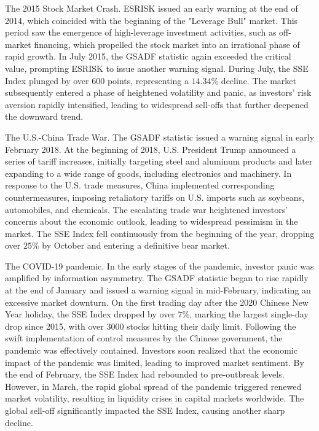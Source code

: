 \documentclass[12pt,a4paper]{article}
\begin{document}
    The 2015 Stock Market Crash. ESRISK issued an early warning at the end of 2014, which coincided with the beginning of the "Leverage Bull" market. This period saw the emergence of high-leverage investment activities, such as off-market financing, which propelled the stock market into an irrational phase of rapid growth. In July 2015, the GSADF statistic again exceeded the critical value, prompting ESRISK to issue another warning signal. During July, the SSE Index plunged by over 600 points, representing a $14.34\%$ decline. The market subsequently entered a phase of heightened volatility and panic, as investors' risk aversion rapidly intensified, leading to widespread sell-offs that further deepened the downward trend.

    The U.S.-China Trade War. The GSADF statistic issued a warning signal in early February 2018. At the beginning of 2018, U.S. President Trump announced a series of tariff increases, initially targeting steel and aluminum products and later expanding to a wide range of goods, including electronics and machinery. In response to the U.S. trade measures, China implemented corresponding countermeasures, imposing retaliatory tariffs on U.S. imports such as soybeans, automobiles, and chemicals. The escalating trade war heightened investors' concerns about the economic outlook, leading to widespread pessimism in the market. The SSE Index fell continuously from the beginning of the year, dropping over $25\%$ by October and entering a definitive bear market.

    The COVID-19 pandemic. In the early stages of the pandemic, investor panic was amplified by information asymmetry. The GSADF statistic began to rise rapidly at the end of January and issued a warning signal in mid-February, indicating an excessive market downturn. On the first trading day after the 2020 Chinese New Year holiday, the SSE Index dropped by over $7\%$, marking the largest single-day drop since 2015, with over 3000 stocks hitting their daily limit. Following the swift implementation of control measures by the Chinese government, the pandemic was effectively contained. Investors soon realized that the economic impact of the pandemic was limited, leading to improved market sentiment. By the end of February, the SSE Index had rebounded to pre-outbreak levels. However, in March, the rapid global spread of the pandemic triggered renewed market volatility, resulting in liquidity crises in capital markets worldwide. The global sell-off significantly impacted the SSE Index, causing another sharp decline.
\end{document}
